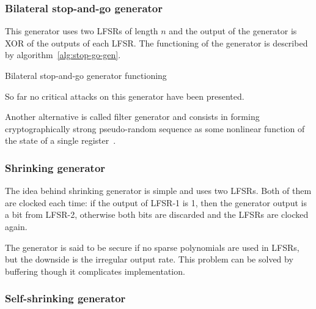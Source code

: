\subsubsection{Bilateral stop-and-go generator}

This generator uses two LFSRs of length $n$ and the output of the generator is
XOR of the outputs of each LFSR. The functioning of the generator is described
by algorithm~\ref{alg:stop-go-gen}.

\begin{algorithm}
    \caption{Bilateral stop-and-go generator functioning}
    \label{alg:stop-go-gen}
    \dontprintsemicolon

    \;
    \;
\end{algorithm}

So far no critical attacks on this generator have been presented.

Another alternative is called filter generator and consists in
forming cryptographically strong pseudo-random sequence as some nonlinear
function of the state of a single register~\cite{robshaw:rsa:streamciphers}.

\subsubsection{Shrinking generator}

The idea behind shrinking generator is simple and uses two LFSRs. Both of them
are clocked each time: if the output of LFSR-1 is 1, then the generator output
is a bit from LFSR-2, otherwise both bits are discarded and the LFSRs are
clocked again.

The generator is said to be secure if no sparse polynomials are used in LFSRs,
but the downside is the irregular output rate. This problem can be solved by
buffering though it complicates implementation. 

\subsubsection{Self-shrinking generator}

